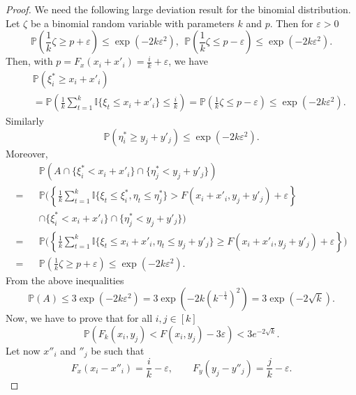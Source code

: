 \documentclass[12pt,twoside]{article}
\theoremstyle{definition}
\theoremstyle{remark}
\numberwithin{equation}{section}
\theoremstyle{plain}
\theoremstyle{remark}
\def\P{{\mathbb {P}}}                       \def\Q{{\mathbb {Q}}}
\def\I{{\mathbb {I}}}                       \def\M{{\mathbb {M}}}
\begin{document}
\begin{proof}
We need the following large deviation result for the binomial distribution.
Let $\zeta$ be a binomial random variable with parameters $k$ and $p$.
Then for $\varepsilon>0$
\begin{equation} \label{H44}
\P\left(\frac{1}{k} \zeta \ge p+\varepsilon \right)
\le \exp (-2k \varepsilon^2 ), \ \
\P\left(\frac{1}{k} \zeta \le p-\varepsilon \right)
\le \exp (-2k \varepsilon^2 ) .
\end{equation}
Then, with $p= F_x(x_i+ x'_i) = \frac{i}{k }  + \varepsilon$, we have
\begin{eqnarray*}
&&\P\left(\xi^\ast_i \ge  x_i+ x'_i  \right) \\
&&=\P \left( \frac{1}{k} \sum_{t=1}^k \I\{ \xi_t \le x_i+ x'_i\}  \le \frac{i}{k} \right)
= \P\left(\frac{1}{k} \zeta \le p-\varepsilon \right)
\le \exp (-2k \varepsilon^2 ) .
\end{eqnarray*}
Similarly 
$$
\P\left(\eta^\ast_i \ge  y_j+ y'_j  \right) 
\le \exp (-2k \varepsilon^2 ) .
$$
%
Moreover,
\begin{eqnarray*} 
&& \P\left(A \cap \{ \xi^\ast_i <  x_i+ x'_i \} \cap \{ \eta^\ast_j <  y_j+ y'_j \} \right)  \\
 = &&
\P \Bigg( \left\{ \frac{1}{k} \sum\nolimits_{t=1}^k \I\{ \xi_t \le \xi_i^\ast, \eta_t \le \eta_j^\ast \} 
> F(x_i+ x'_i, y_j+y'_j) +\varepsilon  \right\}     \\
&& \cap \{ \xi^\ast_i <  x_i+ x'_i  \} \cap \{ \eta^\ast_j <  y_j+ y'_j  \} \Bigg)  \\
=&&
\P \Bigg( \left\{ \frac{1}{k} \sum\nolimits_{t=1}^k 
\I\{ \xi_t \le x_i+ x'_i, \eta_t \le y_j+ y'_j \} 
\ge  F(x_i+ x'_i, y_j+y'_j) +\varepsilon  \right\}  \Bigg)   \\
= &&  \P\left(\frac{1}{k} \zeta \ge p+\varepsilon \right)
\le \exp (-2k \varepsilon^2 ) .
\end{eqnarray*}
From the above inequalities
$$
\P(A) \le 3 \exp (-2k \varepsilon^2 ) = 3 \exp (-2k (k^{-\frac{1}{4}})^2 ) = 3 \exp (-2\sqrt{k}).
$$
%
Now, we have to prove that for all $i,j\in [k]$
\begin{equation} \label{H41+}
\P \left( F_k(x_i,y_j) < F(x_i,y_j) -3\varepsilon   \right)
< 3 e^{-2\sqrt{k}} .
\end{equation} 
Let now
$x''_i$ and $''_j$ be such that
\begin{equation*}
F_x(x_i- x''_i) = \frac{i}{k }  - \varepsilon, \qquad  F_y(y_j- y''_j) = \frac{j}{k }  - \varepsilon .
\end{equation*} 

\end{proof}
\end{document}
